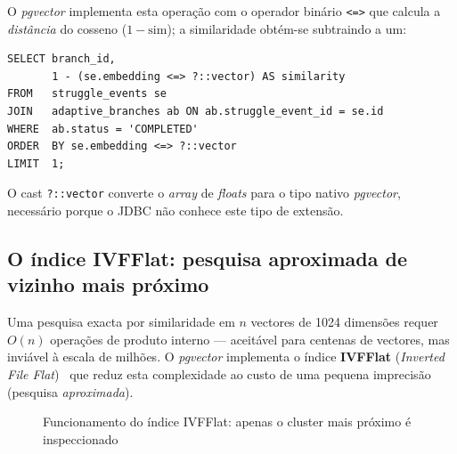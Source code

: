 O \textit{pgvector} implementa esta operação com o operador binário
\texttt{<=>} que calcula a \emph{distância} do cosseno ($1 - \text{sim}$);
a similaridade obtém-se subtraindo a um:

\begin{verbatim}
SELECT branch_id,
       1 - (se.embedding <=> ?::vector) AS similarity
FROM   struggle_events se
JOIN   adaptive_branches ab ON ab.struggle_event_id = se.id
WHERE  ab.status = 'COMPLETED'
ORDER  BY se.embedding <=> ?::vector
LIMIT  1;
\end{verbatim}

O cast \texttt{?::vector} converte o \textit{array} de \textit{floats}
para o tipo nativo \textit{pgvector}, necessário porque o JDBC não
conhece este tipo de extensão.

\subsection*{O índice IVFFlat: pesquisa aproximada de vizinho mais próximo}

Uma pesquisa exacta por similaridade em $n$ vectores de 1024 dimensões
requer $O(n)$ operações de produto interno — aceitável para centenas de
vectores, mas inviável à escala de milhões.
O \textit{pgvector} implementa o índice \textbf{IVFFlat}
(\textit{Inverted File Flat})~\cite{johnson2019billion} que reduz esta
complexidade ao custo de uma pequena imprecisão (pesquisa
\emph{aproximada}).

\begin{figure}[htbp]
  \centering
  \caption{Funcionamento do índice IVFFlat: apenas o cluster mais próximo é inspeccionado}
  \label{fig:ivfflat}
\end{figure}

